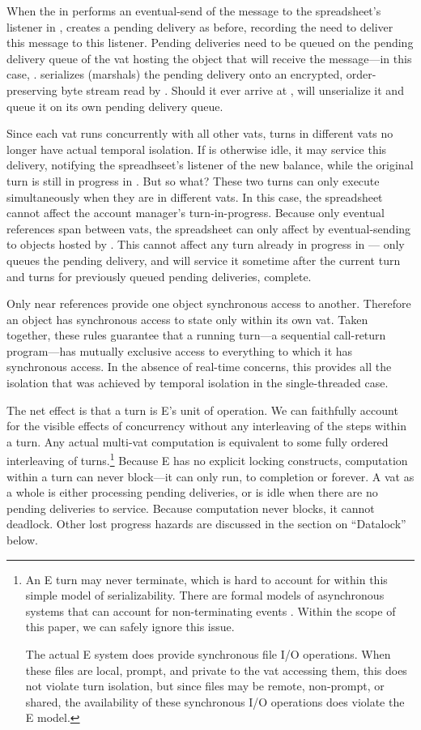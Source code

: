 \documentclass{llncs}
\begin{document}
When the  in  performs an eventual-send of
the  message to the spreadsheet's listener in
,  creates a pending delivery as before, recording the
need to deliver this message to this listener. Pending deliveries need
to be queued on the pending delivery queue of the vat hosting the
object that will receive the message---in this case, . 
serializes (marshals) the pending delivery onto an encrypted,
order-preserving byte stream read by . Should it ever arrive at
,  will unserialize it and queue it on its own pending
delivery queue.

Since each vat runs concurrently with all other vats, turns in
different vats no longer have actual temporal isolation. If  is
otherwise idle, it may service this delivery, notifying the
spreadhseet's listener of the new balance, while the original turn is
still in progress in . But so what? These two turns can only
execute simultaneously when they are in different vats. In this case,
the spreadsheet cannot affect the account manager's
turn-in-progress. Because only eventual references span between vats,
the spreadsheet can only affect  by eventual-sending to objects
hosted by . This cannot affect any turn already in progress in
--- only queues the pending delivery, and will service
it sometime after the current turn and turns for previously queued
pending deliveries, complete.

Only near references provide one object synchronous access to
another. Therefore an object has synchronous access to state only
within its own vat. Taken together, these rules guarantee that a
running turn---a sequential call-return program---has mutually
exclusive access to everything to which it has synchronous access. In
the absence of real-time concerns, this provides all the isolation
that was achieved by temporal isolation in the single-threaded case.

The net effect is that a turn is E's unit of operation. We can
faithfully account for the visible effects of concurrency without any
interleaving of the steps within a turn. Any actual multi-vat
computation is equivalent to some fully ordered interleaving of
turns.\footnote{
%
An E turn may never terminate, which is hard to account for within
this simple model of serializability. There are formal models of
asynchronous systems that can account for non-terminating events
\cite{chandy:snapshots}. Within the scope of this paper, we can safely
ignore this issue.

The actual E system does provide synchronous file I/O operations. When
these files are local, prompt, and private to the vat accessing them,
this does not violate turn isolation, but since files may be remote,
non-prompt, or shared, the availability of these synchronous I/O
operations does violate the E model.}
%
Because E has no explicit locking constructs, computation within a
turn can never block---it can only run, to completion or forever. A
vat as a whole is either processing pending deliveries, or is idle
when there are no pending deliveries to service. Because computation
never blocks, it cannot deadlock.  Other lost progress hazards are
discussed in the section on ``Datalock'' below.
\end{document}

